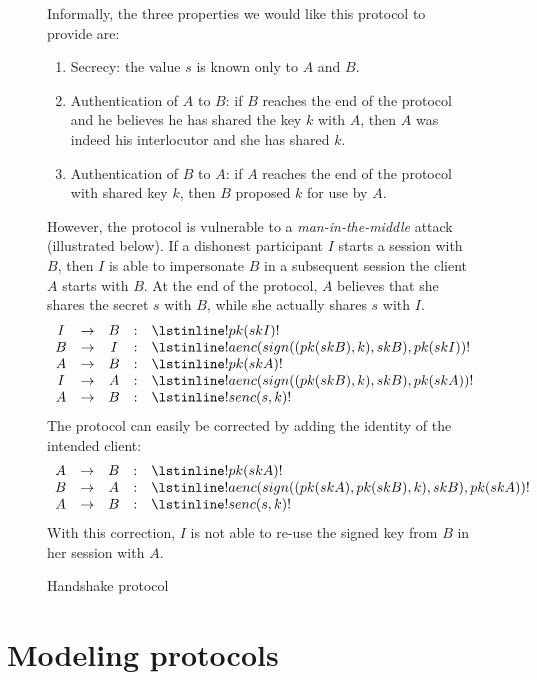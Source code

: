 \documentclass{book}
\newcommand{\A}{A}
\newcommand{\B}{B}
\newcommand{\M}{I}
\begin{document}
\begin{figure}
  Informally, the three properties we would like this protocol to
  provide are:
%
  \begin{enumerate}
  \item Secrecy: the value $s$ is known only to $\A$ and $\B$.
  \item Authentication of $\A$ to $\B$: if $\B$ reaches the end of the protocol and
  he believes he has shared the key $k$ with $\A$, then $\A$ was indeed his interlocutor
  and she has shared $k$.
  \item Authentication of  $\B$ to $\A$: if $\A$ reaches the end of the protocol
  with shared key $k$, then $\B$ proposed $k$ for use by $\A$.
  \end{enumerate}
%
  However, the protocol is vulnerable to a \emph{man-in-the-middle}
  attack (illustrated below). If a dishonest participant $\M$ starts a session with $\B$,
  then $\M$ is able to impersonate $\B$ in a subsequent session the client $\A$
  starts with $\B$. At the end of the protocol, $\A$ believes that she shares
  the secret $s$ with $\B$, while she actually shares $s$ with $\M$.
  \[
  \begin{array}{ccccl}
	\M &\rightarrow& \B&:& \lstinline!pk(skI)! \\
	\B &\rightarrow& \M&:& \lstinline!aenc(sign((pk(skB),k),skB),pk(skI))! \\
	\A &\rightarrow& \B&:& \lstinline!pk(skA)! \\
	\M &\rightarrow& \A&:& \lstinline!aenc(sign((pk(skB),k),skB),pk(skA))! \\
	\A &\rightarrow& \B&:& \lstinline!senc(s,k)!
  \end{array}
  \]
  The protocol can easily be corrected by adding the identity of the
  intended client:
  \[
  \begin{array}{ccccl}
	\A &\rightarrow&\B &:& \lstinline!pk(skA)! \\
	\B &\rightarrow&\A &:& \lstinline!aenc(sign((pk(skA),pk(skB),k),skB),pk(skA))! \\
	\A &\rightarrow&\B &:& \lstinline!senc(s,k)!
  \end{array}
  \]%
With this correction, $\M$ is not able to re-use the signed
key from $\B$ in her session with $\A$.
  \caption{Handshake protocol}
  \label{fig:handshakeprotocol}
\end{figure}

\section{Modeling protocols}\label{sec:processes}
\end{document}
